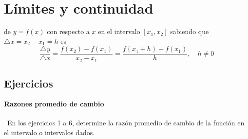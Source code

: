 \chapter{Límites y continuidad}


\begin{tcolorbox}[colframe = white]
    \begin{def.} de $y=f(x)$ con respecto a $x$ en el intervalo $[x_1,x_2]$ sabiendo que $\triangle x = x_2 - x_1 = h$ es $$\dfrac{\triangle y}{\triangle x} = \dfrac{f(x_2) - f(x_1)}{x_2-x_1} = \dfrac{f(x_1+h) - f(x_1)}{h}, \quad h\neq 0$$
    \end{def.}
\end{tcolorbox}

\section{Ejercicios}

\textbf{Razones promedio de cambio}\\\\\
En los ejercicios 1 a 6, determine la razón promedio de cambio de la función en el intervalo o intervalos dados.\\\\

